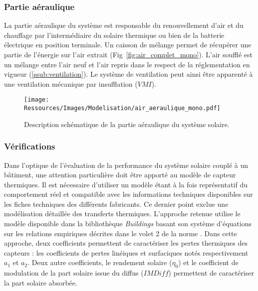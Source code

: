 \subsubsection{Partie aéraulique} %
\label{ssub:partie_aéraulique}
La partie aéraulique du système est responsable du renouvellement d’air et du chauffage
par l’intermédiaire du solaire thermique ou bien de la batterie électrique en
position terminale. Un caisson de mélange permet de récupérer une partie de l’énergie
sur l’air extrait (Fig~\ref{fig:air_complet_mono}). L’air soufflé est un mélange entre
l’air neuf et l’air repris dans le respect de la réglementation en vigueur (\ref{ssub:ventilation}).
Le système de ventilation peut ainsi être apparenté à une ventilation mécanique par insufflation
($VMI$).

\begin{figure}
    \begin{center}
        \texttt{[image: Ressources/Images/Modelisation/air\_aeraulique\_mono.pdf]}
    \end{center}
    \caption{Description schématique de la partie aéraulique du système solaire.
             \label{fig:schema_aeraulique}}
\end{figure}

\subsubsection{Vérifications} %
\label{ssub:verifications}
Dans l’optique de l’évaluation de la performance  du système solaire couplé à un bâtiment, une
attention particulière doit être apporté au modèle de capteur thermiques. Il est
nécessaire d’utiliser un modèle étant à la fois représentatif du comportement réel
et compatible avec les informations techniques disponibles sur les fiches techniques
des différents fabricants. Ce dernier point exclue une modélisation détaillée
des transferts thermiques. L’approche retenue utilise le modèle disponible dans la
bibliothèque \emph{Buildings} basant son système d’équations sur les relations
empiriques décrites dans le volet 2 de la norme \textcite{EN129752}.
Dans cette approche, deux coefficients
permettent de caractériser les pertes thermiques des capteurs : les coefficients de pertes linéiques
et surfaciques notés respectivement $a_{1}$ et $a_{2}$. Deux autre coefficients, le rendement solaire ($\eta_{0}$)
et le coefficient de modulation de la part solaire issue du diffus ($IMDiff$)
permettent de caractériser la part solaire absorbée.

